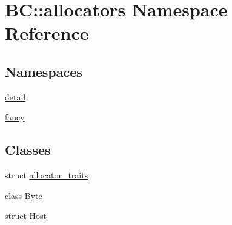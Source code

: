 \hypertarget{namespaceBC_1_1allocators}{}\section{BC\+:\+:allocators Namespace Reference}
\label{namespaceBC_1_1allocators}
\subsection*{Namespaces}
\begin{DoxyCompactItemize}
\item 
 \hyperlink{namespaceBC_1_1allocators_1_1detail}{detail}
\item 
 \hyperlink{namespaceBC_1_1allocators_1_1fancy}{fancy}
\end{DoxyCompactItemize}
\subsection*{Classes}
\begin{DoxyCompactItemize}
\item 
struct \hyperlink{structBC_1_1allocators_1_1allocator__traits}{allocator\+\_\+traits}
\item 
class \hyperlink{classBC_1_1allocators_1_1Byte}{Byte}
\item 
struct \hyperlink{structBC_1_1allocators_1_1Host}{Host}
\end{DoxyCompactItemize}
